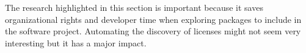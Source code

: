 \documentclass[journal]{IEEEtran}
\begin{document}
The research highlighted in this section is important because it saves organizational rights and developer time when exploring packages to include in the software project. Automating the discovery of licenses might not seem very interesting but it has a major impact. 



 


\end{document}

